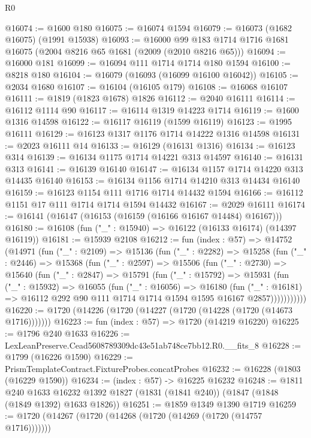\begin{lexlean}{R0}
\begin{coremodule}
@16074 := @1600 @180
@16075 := @16074 @1594
@16079 := @16073 (@1682 @16075) (@1991 @15938)
@16093 := @16000 @99 @183 @1714 @1716 @1681 @16075 (@2004 @8216 @65 @1681 (@2009 (@2010 @8216 @65)))
@16094 := @16000 @181
@16099 := @16094 @111 @1714 @1714 @180 @1594
@16100 := @8218 @180
@16104 := @16079 (@16093 (@16099 @16100 @16042))
@16105 := @2034 @1680
@16107 := @16104 (@16105 @179)
@16108 := @16068 @16107
@16111 := @1819 (@1823 @1678) @1826
@16112 := @2040 @16111
@16114 := @16112 @1114 @90
@16117 := @16114 @1319 @14223 @1714
@16119 := @1600 @1316 @14598
@16122 := @16117 @16119 (@1599 @16119)
@16123 := @1995 @16111
@16129 := @16123 @1317 @1176 @1714 @14222 @1316 @14598
@16131 := @2023 @16111 @14
@16133 := @16129 (@16131 @1316)
@16134 := @16123 @314
@16139 := @16134 @1175 @1714 @14221 @313 @14597
@16140 := @16131 @313
@16141 := @16139 @16140
@16147 := @16134 @1157 @1714 @14220 @313 @14435 @16140
@16153 := @16134 @1156 @1714 @14210 @313 @14434 @16140
@16159 := @16123 @1154 @111 @1716 @1714 @14432 @1594
@16166 := @16112 @1151 @17 @111 @1714 @1714 @1594 @14432
@16167 := @2029 @16111
@16174 := @16141 (@16147 (@16153 (@16159 (@16166 @16167 @14484) @16167)))
@16180 := @16108 (fun ("_" : @15940) => @16122 (@16133 @16174) (@14397 @16119))
@16181 := @15939 @2108
@16212 := fun (index : @57) =>
  @14752
    (@14971
      (fun ("_" : @2109) =>
      @15136
        (fun ("_" : @2282) =>
        @15258
          (fun ("_" : @2446) =>
          @15368
            (fun ("_" : @2597) =>
            @15506
              (fun ("_" : @2730) =>
              @15640
                (fun ("_" : @2847) =>
                @15791
                  (fun ("_" : @15792) =>
                  @15931
                    (fun ("_" : @15932) =>
                    @16055
                      (fun ("_" : @16056) =>
                      @16180
                        (fun ("_" : @16181) =>
                        @16112 @292 @90 @111 @1714 @1714 @1594 @1595 @16167 @2857)))))))))))
@16220 := @1720 (@14226 (@1720 (@14227 (@1720 (@14228 (@1720 (@14673 @1716)))))))
@16223 := fun (index : @57) => @1720 (@14219 @16220)
@16225 := @1796 @240 @1633
@16226 := LexLeanPreserve.Cead5608789309dc43e51ab748ce7bb12.R0.__fits_8
@16228 := @1799 (@16226 @1590)
@16229 := PrismTemplateContract.FixtureProbes.concatProbes
@16232 := @16228 (@1803 (@16229 @1590))
@16234 := (index : @57) -> @16225 @16232
@16248 := @1811
    @240
    @1633
    @16232
    @1392
    @1827
    (@1831 (@1841 @240))
    (@1847 (@1848 (@1849 @1392) @1633 @1826))
@16251 := @1859 @1349 @1390 @1719
@16259 := @1720 (@14267 (@1720 (@14268 (@1720 (@14269 (@1720 (@14757 @1716)))))))

\end{coremodule}
\end{lexlean}
